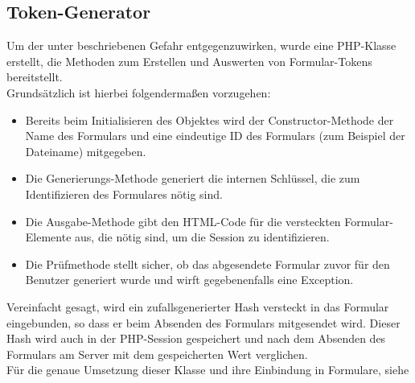 \subsection{Token-Generator}
\label{sec:content_draft_token}
Um der unter  beschriebenen Gefahr entgegenzuwirken, wurde eine PHP-Klasse erstellt, die Methoden zum Erstellen und Auswerten von Formular-Tokens bereitstellt.\\
Grundsätzlich ist hierbei folgendermaßen vorzugehen:
\begin{itemize}
	\item Bereits beim Initialisieren des Objektes wird der Constructor-Methode der Name des Formulars und eine eindeutige ID des Formulars (zum Beispiel der Dateiname) mitgegeben.
	\item Die Generierungs-Methode generiert die internen Schlüssel, die zum Identifizieren des Formulares nötig sind.
	\item Die Ausgabe-Methode gibt den HTML-Code für die versteckten Formular-Elemente aus, die nötig sind, um die Session zu identifizieren.
	\item Die Prüfmethode stellt sicher, ob das abgesendete Formular zuvor für den Benutzer generiert wurde und wirft gegebenenfalls eine Exception.
\end{itemize}
Vereinfacht gesagt, wird ein zufallsgenerierter Hash versteckt in das Formular eingebunden, so dass er beim Absenden des Formulars mitgesendet wird. Dieser Hash wird auch in der PHP-Session gespeichert und nach dem Absenden des Formulars am Server mit dem gespeicherten Wert verglichen.\\
Für die genaue Umsetzung dieser Klasse und ihre Einbindung in Formulare, siehe 